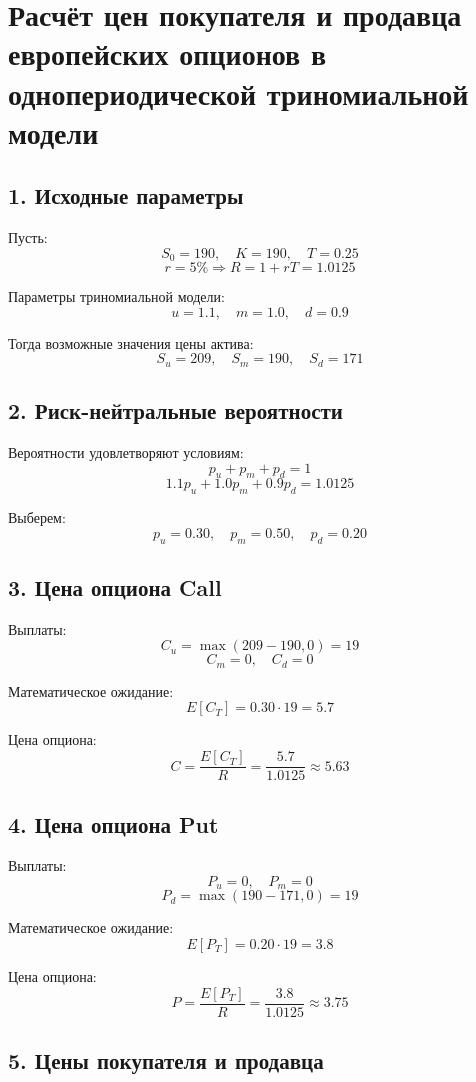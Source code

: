 \section*{Расчёт цен покупателя и продавца европейских опционов в однопериодической триномиальной модели}

\subsection*{1. Исходные параметры}

Пусть:
\[
S_0 = 190, \quad K = 190, \quad T = 0.25
\]
\[
r = 5\% \Rightarrow R = 1 + rT = 1.0125
\]

Параметры триномиальной модели:
\[
u = 1.1, \quad m = 1.0, \quad d = 0.9
\]

Тогда возможные значения цены актива:
\[
S_u = 209, \quad S_m = 190, \quad S_d = 171
\]

\subsection*{2. Риск-нейтральные вероятности}

Вероятности удовлетворяют условиям:
\[
p_u + p_m + p_d = 1
\]
\[
1.1p_u + 1.0p_m + 0.9p_d = 1.0125
\]

Выберем:
\[
p_u = 0.30, \quad p_m = 0.50, \quad p_d = 0.20
\]

\subsection*{3. Цена опциона Call}

Выплаты:
\[
C_u = \max(209 - 190, 0) = 19
\]
\[
C_m = 0, \quad C_d = 0
\]

Математическое ожидание:
\[
E[C_T] = 0.30 \cdot 19 = 5.7
\]

Цена опциона:
\[
C = \frac{E[C_T]}{R} = \frac{5.7}{1.0125} \approx 5.63
\]

\subsection*{4. Цена опциона Put}

Выплаты:
\[
P_u = 0, \quad P_m = 0
\]
\[
P_d = \max(190 - 171, 0) = 19
\]

Математическое ожидание:
\[
E[P_T] = 0.20 \cdot 19 = 3.8
\]

Цена опциона:
\[
P = \frac{E[P_T]}{R} = \frac{3.8}{1.0125} \approx 3.75
\]

\subsection*{5. Цены покупателя и продавца}

